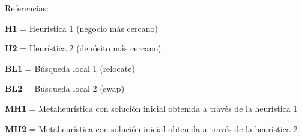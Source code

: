 \documentclass[
]{article}
\begin{document}
Referencias:

\textbf{H1} = Heurística 1 (negocio más cercano)

\textbf{H2} = Heurística 2 (depósito más cercano)

\textbf{BL1} = Búsqueda local 1 (relocate)

\textbf{BL2} = Búsqueda local 2 (swap)

\textbf{MH1} = Metaheurística con solución inicial obtenida a través de
la heurística 1

\textbf{MH2} = Metaheurística con solución inicial obtenida a través de
la heurística 2
\end{document}
